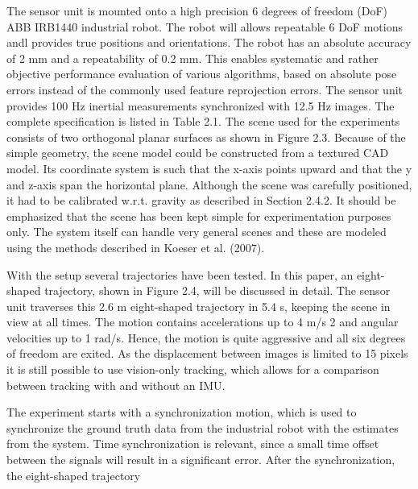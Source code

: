 The sensor unit is mounted onto a high precision 6 degrees of freedom (DoF) ABB IRB1440 industrial robot. The robot will allows repeatable 6 DoF motions andl provides true positions and orientations. The robot has an absolute accuracy of 2 mm and a repeatability of 0.2 mm. This enables systematic and rather objective performance evaluation of various algorithms, based on absolute pose errors instead of the commonly used feature reprojection errors. The sensor unit provides 100 Hz inertial measurements synchronized with 12.5 Hz images. The complete specification is listed in Table 2.1. The scene used for the experiments consists of two orthogonal planar surfaces as shown in Figure 2.3. Because of the simple geometry, the scene model could be constructed from a textured CAD model. Its coordinate system is such that the x-axis points upward and that the y and z-axis span the horizontal plane. Although the scene was carefully positioned, it had to be calibrated w.r.t. gravity as described in Section 2.4.2. It should be emphasized that the scene has been kept simple for experimentation purposes only. The system itself can handle very general scenes and these are modeled using the methods described in Koeser et al. (2007).

With the setup several trajectories have been tested. In this paper, an eight-shaped trajectory, shown in Figure 2.4, will be discussed in detail. The sensor unit traverses this 2.6 m eight-shaped trajectory in 5.4 s, keeping the scene in view at all times. The motion contains accelerations up to 4 m/s 2 and angular velocities up to 1 rad/s. Hence, the motion is quite aggressive and all six degrees of freedom are exited. As the displacement between images is limited to 15 pixels it is still possible to use vision-only tracking, which allows for a comparison between tracking with and without an IMU.

The experiment starts with a synchronization motion, which is used to synchronize the ground truth data from the industrial robot with the estimates from the system. Time synchronization is relevant, since a small time offset between the signals will result in a significant error. After the synchronization, the eight-shaped trajectory 













